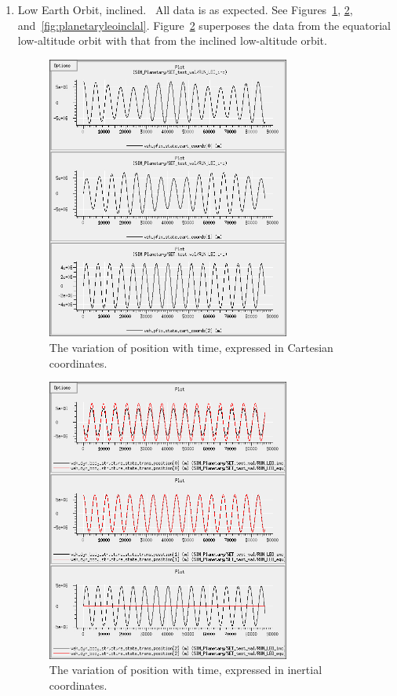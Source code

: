 \begin{description}
\begin{enumerate}
\clearpage

\item {Low Earth Orbit, inclined.}\ \newline
All data is as expected.  See Figures~\ref{fig:planetaryleoinccart}, \ref{fig:planetaryleoincinrtl}, and~\ref{fig:planetaryleoinclal}.  Figure~\ref{fig:planetaryleoincinrtl} superposes the data from the equatorial low-altitude orbit with that from the inclined low-altitude orbit.

\begin{figure}[!ht]
  \begin{center}
        \includegraphics[width=80mm]{figures/planetary_leo_inc_cart.jpg}
        \caption{The variation of position with time, expressed in Cartesian coordinates.} 
        \label{fig:planetaryleoinccart}
  \end{center}
\end{figure}

\begin{figure}[!ht]
  \begin{center}
        \includegraphics[width=80mm]{figures/planetary_leo_inc_inrtl.jpg}
        \caption{The variation of position with time, expressed in inertial coordinates.} 
        \label{fig:planetaryleoincinrtl}
  \end{center}
\end{figure}


\end{enumerate}
\end{description}
